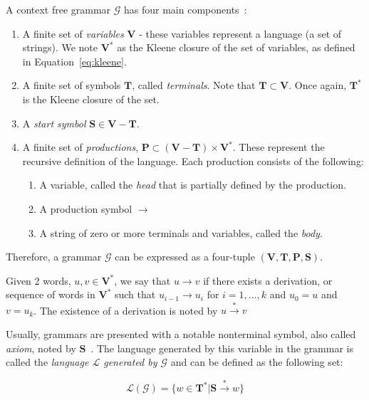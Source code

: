 A context free grammar $\mathcal{G}$ has four main components~\cite{handbook-cfg, leeuwen-cfg}:
\begin{enumerate}
    \item A finite set of \emph{variables} $\mathbf{V}$ - these variables represent a language (a set of strings). We note $\mathbf{V}^*$ as the Kleene closure of the set of variables, as defined in Equation~\ref{eq:kleene}.
    \item A finite set of symbols $\mathbf{T}$, called \emph{terminals}. Note that $\mathbf{T} \subset \mathbf{V}$. Once again, $\mathbf{T}^*$ is the Kleene closure of the set.
    \item A \emph{start symbol} $\mathbf{S} \in \mathbf{V}-\mathbf{T}$.
    \item A finite set of \emph{productions}, $\mathbf{P} \subset (\mathbf{V}-\mathbf{T})\times \mathbf{V}^*$. These represent the recursive definition of the language. Each production consists of the following:
    \begin{enumerate}
        \item A variable, called the \emph{head} that is partially defined by the production.
        \item A production symbol $\rightarrow$
        \item A string of zero or more terminals and variables, called the \emph{body}.
    \end{enumerate}
\end{enumerate}

Therefore, a grammar $\mathcal{G}$ can be expressed as a four-tuple $(\mathbf{V}, \mathbf{T}, \mathbf{P}, \mathbf{S})$. 

Given 2 words, $u, v \in \mathbf{V}^*$, we say that $u \rightarrow v$ if there exists a derivation, or sequence of words in $\mathbf{V}^*$ such that $u_{i-1} \rightarrow u_{i}$ for $i = 1,\dots,k$ and $u_0=u$ and $v=u_k$. The existence of a derivation is noted by $u \xrightarrow{*} v$

Usually, grammars are presented with a notable nonterminal symbol, also called \emph{axiom}, noted by $\mathbf{S}$~\cite{hopcroft-automata, handbook-cfg}. The language generated by this variable in the grammar is called the \emph{language $\mathcal{L}$ generated by $\mathcal{G}$}  and can be defined as the following set:

\begin{equation}\label{eq:axiom-grammar}
\mathcal{L}(\mathcal{G}) = \{w \in \mathbf{T}^* | \mathbf{S} \xrightarrow{*} w \}
\end{equation}

